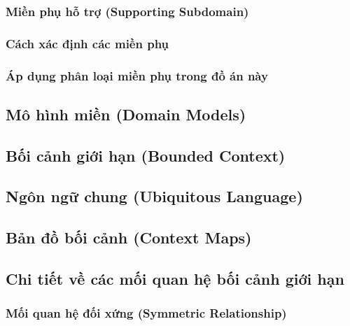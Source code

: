 \documentclass{report} %
\begin{document}


\subsubsection{Miền phụ hỗ trợ (Supporting Subdomain)}



\newpage

\subsubsection{Cách xác định các miền phụ}



\newpage

\subsubsection{Áp dụng phân loại miền phụ trong đồ án này}



\subsection{Mô hình miền (Domain Models)}



\subsection{Bối cảnh giới hạn (Bounded Context)}



\subsection{Ngôn ngữ chung (Ubiquitous Language)}



\subsection{Bản đồ bối cảnh (Context Maps)}



\subsection{Chi tiết về các mối quan hệ bối cảnh giới hạn}

% 

\subsubsection{Mối quan hệ đối xứng (Symmetric Relationship)}

\end{document}
